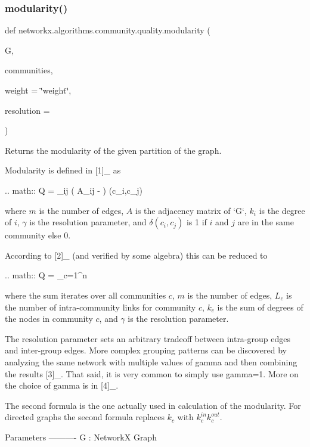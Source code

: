\subsubsection{\texorpdfstring{modularity()}{modularity()}}
{\footnotesize\ttfamily def networkx.\+algorithms.\+community.\+quality.\+modularity (\begin{DoxyParamCaption}\item[{}]{G,  }\item[{}]{communities,  }\item[{}]{weight = {\ttfamily \char`\"{}weight\char`\"{}},  }\item[{}]{resolution = {} }\end{DoxyParamCaption})}

\begin{DoxyVerb}Returns the modularity of the given partition of the graph.

Modularity is defined in [1]_ as

.. math::
    Q =  \sum_{ij} \left( A_{ij} - \gamma{}\right)
        \delta(c_i,c_j)

where $m$ is the number of edges, $A$ is the adjacency matrix of `G`,
$k_i$ is the degree of $i$, $\gamma$ is the resolution parameter,
and $\delta(c_i, c_j)$ is 1 if $i$ and $j$ are in the same community else 0.

According to [2]_ (and verified by some algebra) this can be reduced to

.. math::
   Q = \sum_{c=1}^{n}

where the sum iterates over all communities $c$, $m$ is the number of edges,
$L_c$ is the number of intra-community links for community $c$,
$k_c$ is the sum of degrees of the nodes in community $c$,
and $\gamma$ is the resolution parameter.

The resolution parameter sets an arbitrary tradeoff between intra-group
edges and inter-group edges. More complex grouping patterns can be
discovered by analyzing the same network with multiple values of gamma
and then combining the results [3]_. That said, it is very common to
simply use gamma=1. More on the choice of gamma is in [4]_.

The second formula is the one actually used in calculation of the modularity.
For directed graphs the second formula replaces $k_c$ with $k^{in}_c k^{out}_c$.

Parameters
----------
G : NetworkX Graph


\end{DoxyVerb}

